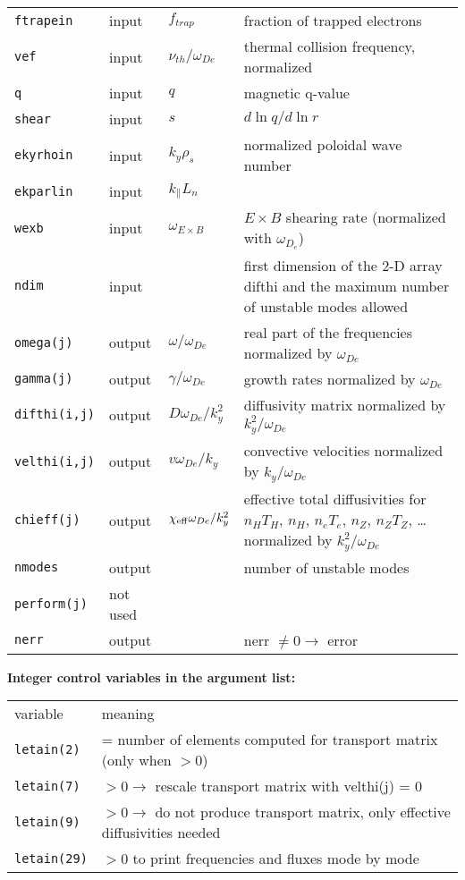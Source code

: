 \begin{center}
\begin{tabular}{lllp{3.0in}}
{\tt ftrapein}  & input & $f_{trap} $ &
    fraction of trapped electrons \\
{\tt vef}       & input & $ \nu_{th} / \omega_{De} $ &
     thermal collision frequency, normalized \\
{\tt q}         & input & $ q $ & magnetic q-value \\
{\tt shear}     & input & $ s $ & $ d \ln q / d \ln r $ \\
{\tt ekyrhoin}  & input & $ k_y \rho_s $ & normalized poloidal
                    wave number \\
{\tt ekparlin}  & input & $k_\parallel L_n$ & \\
{\tt wexb}      & input & $\omega_{E\times B}$& $E\times B$ shearing rate 
(normalized with $\omega_{D_e}$) \\
{\tt ndim} & input & & first dimension of the 2-D array difthi
               and the maximum number of unstable modes allowed \\
{\tt omega(j)}  & output & $\omega / \omega_{De} $ &
     real part of the frequencies normalized by $ \omega_{De} $ \\
{\tt gamma(j)}  & output & $\gamma / \omega_{De} $ &
     growth rates normalized by $ \omega_{De} $ \\
{\tt difthi(i,j)}      & output & $ D \omega_{De} / k_y^2 $
      & diffusivity matrix normalized by $ k_y^2 / \omega_{De} $ \\
{\tt velthi(i,j)}      & output & $ v \omega_{De} / k_y $
      & convective velocities normalized by $ k_y / \omega_{De} $ \\
{\tt chieff(j)} & output & $ \chi_{\rm eff} \omega_{De} / k_y^2 $ 
      & effective total diffusivities
        for $ n_H T_H $, $ n_H $, $ n_e T_e $, 
        $ n_Z $, $ n_Z T_Z $, \ldots
        normalized by $ k_y^2 / \omega_{De} $ \\
{\tt nmodes} & output & & number of unstable modes \\
{\tt perform(j)} &   not used &  &\\
{\tt nerr}       & output & & nerr $\neq 0 \rightarrow$ error\\  
\end{tabular}
\end{center}
\newpage
\renewcommand{\arraystretch}{1.0}
\begin{center}
{\bf Integer control variables in the argument list:}
\begin{tabular}{lp{4.0in}}
variable & meaning \\
{\tt letain(2)} & = number of elements computed for transport matrix
                    (only when $> 0$) \\
{\tt letain(7)} &$ > 0 \rightarrow$ rescale transport matrix with velthi(j) = 0 \\
{\tt letain(9)} &$ > 0 \rightarrow$ do not produce transport matrix, only 
                       effective diffusivities needed\\
{\tt letain(29)} & $ > 0 $ to print frequencies and fluxes mode by mode \\
\end{tabular}
\end{center}

